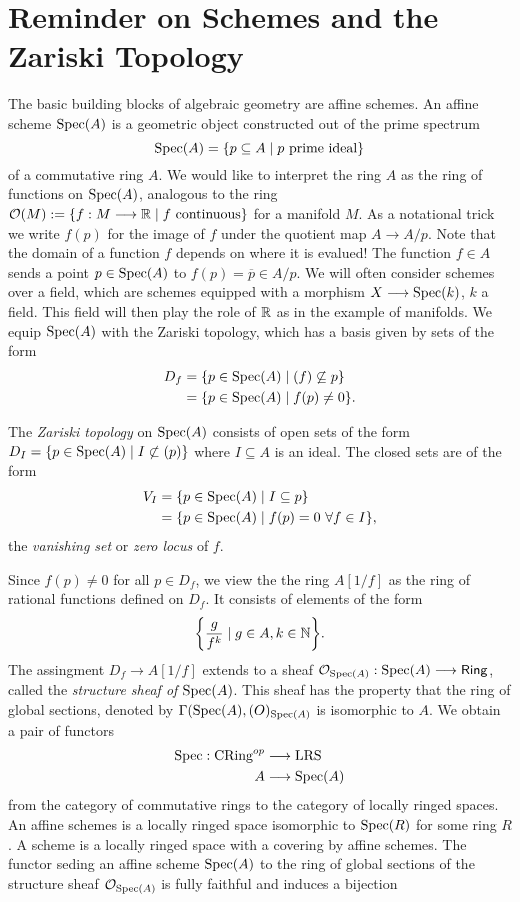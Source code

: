 \section{Reminder on Schemes and the Zariski Topology}
The basic building blocks of algebraic geometry are affine schemes. An affine scheme $\operatorname{Spec}(A)$ is a geometric object constructed out of the prime spectrum
\[
	\operatorname{Spec}(A) = \{p \subseteq A \mid p \text{ prime ideal}\}
\]
of a commutative ring $A$. We would like to interpret the ring $A$ as the ring of functions on $\operatorname{Spec}(A)$, analogous to the ring
$\mathcal{O}(M) := \{f: M \longrightarrow \mathbb{R} \mid f \text{ continuous}\}$
for a manifold $M$. As a notational trick we write $f(p)$ for the image of $f$ under the quotient map $A \to A/p$. Note that the domain of a function $f$ depends on where it is evalued! The function $f \in A$ sends a point $p \in \operatorname{Spec}(A)$ to $f(p) = \overline{p} \in A/p$.  We will often consider schemes over a field, which are schemes equipped with a morphism $X \longrightarrow \operatorname{Spec}(k)$, $k$ a field. This field will then play the role of $\mathbb{R}$ as in the example of manifolds. We equip $\operatorname{Spec}(A)$ with the Zariski topology, which has a basis given by sets of the form
\begin{align*}
	D_f & = \{ p \in \operatorname{Spec}(A) \mid (f) \not \subseteq p \} \\
	    & = \{ p \in \operatorname{Spec}(A) \mid f(p) \neq 0\}.
\end{align*}
\begin{definition}
	The \textit{Zariski topology} on $\operatorname{Spec}(A)$ consists of open sets of the form $D_I = \{ p \in \operatorname{Spec}(A) \mid I \not \subset (p)\}$ where $I \subseteq A$ is an ideal. The closed sets are of the form
	\begin{align*}
		V_I & = \{ p \in \operatorname{Spec}(A) \mid I \subseteq p \}              \\
		    & = \{ p \in \operatorname{Spec}(A) \mid f(p) = 0\ \forall f \in I \},
	\end{align*}
	the \textit{vanishing set} or \textit{zero locus} of $f$.
\end{definition}

Since $f(p) \neq 0$ for all $p \in D_f$, we view the the ring $A[1/f]$ as the ring of rational functions defined on $D_f$. It consists of elements of the form
\[
	\biggl\{ \frac{g}{f^k} \mid g \in A, k \in \mathbb{N} \biggr\}.
\]
The assingment $D_f \to A[1/f]$ extends to a sheaf $\mathcal{O}_{\operatorname{Spec}(A)}: \operatorname{Spec}(A) \longrightarrow \mathsf{Ring}$, called the \textit{structure sheaf of $\operatorname{Spec}(A)$}. This sheaf has the property that the ring of global sections, denoted by $\Gamma(\operatorname{Spec}(A), \mathcal{(}O)_{\operatorname{Spec}(A)}$ is isomorphic to $A$. We obtain a pair of functors
\begin{align*}
	\operatorname{Spec} :  \text{CRing}^{op} & \longrightarrow \text{LRS} \\
	A                          & \longrightarrow \operatorname{Spec}(A)
\end{align*}
from the category of commutative rings to the category of locally ringed spaces. An affine schemes is a locally ringed space isomorphic to $\operatorname{Spec}(R)$ for some ring $R$. A scheme is a locally ringed space with a covering by affine schemes. The functor seding an affine scheme $\operatorname{Spec}(A)$ to the ring of global sections of the structure sheaf $\mathcal{O}_{\operatorname{Spec}(A)}$ is fully faithful and induces a bijection

